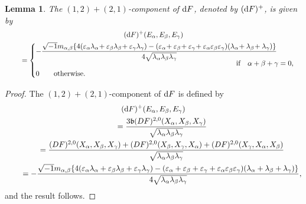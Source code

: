 \documentclass[10pt,a4paper]{amsart}
\numberwithin{equation}{section}
\newtheorem{Lemma}[Theorem]{Lemma}
\begin{document}
\begin{Lemma}
The $(1,2)+(2,1)$-component of ${\rm d}F$, denoted by $({\rm d}F)^{+}$, is given by
\begin{gather*}
({\rm d}F)^{+}(E_{\alpha},E_{\beta},E_{\gamma})
\\ \qquad
{}=\begin{cases}
-\dfrac{\sqrt{-1} m_{\alpha,\beta}\{4(\varepsilon_{\alpha}\lambda_{\alpha} \!+\varepsilon_{\beta}\lambda_{\beta}\!+\varepsilon_{\gamma}\lambda_{\gamma}) -(\varepsilon_{\alpha}\!+\varepsilon_{\beta}\!+\varepsilon_{\gamma} \!+\varepsilon_{\alpha}\varepsilon_{\beta}\varepsilon_{\gamma})(\lambda_{\alpha}\!+\lambda_{\beta} \!+\lambda_{\gamma})\}}{4\sqrt{\lambda_{\alpha}\lambda_{\beta}\lambda_{\gamma}}}
\\[-1ex]
\hspace{98mm}\text{if} \quad \alpha+\beta+\gamma = 0,
\\
0 \qquad \text{otherwise.}
\end{cases}
\end{gather*}
\end{Lemma}
\begin{proof}
 The $(1,2)+(2,1)$-component of ${\rm d}F$ is defined by
\begin{gather*}
({\rm d}F)^{+}(E_{\alpha},E_{\beta},E_{\gamma})
\\ \qquad
{}=\dfrac{3\mathfrak{b}(DF)^{2,0}(X_{\alpha},X_{\beta},X_{\gamma})} {\sqrt{\lambda_{\alpha}\lambda_{\beta}\lambda_{\gamma}}}
\\ \qquad
{}=\dfrac{(DF)^{2,0}(X_{\alpha},X_{\beta},X_{\gamma})+(DF)^{2,0}(X_{\beta},X_{\gamma},X_{\alpha}) +(DF)^{2,0}(X_{\gamma},X_{\alpha},X_{\beta})}{\sqrt{\lambda_{\alpha}\lambda_{\beta}\lambda_{\gamma}}}
\\ \qquad
{}=-\dfrac{\sqrt{-1} m_{\alpha,\beta}\{4(\varepsilon_{\alpha}\lambda_{\alpha} +\varepsilon_{\beta}\lambda_{\beta}+\varepsilon_{\gamma}\lambda_{\gamma}) -(\varepsilon_{\alpha}+\varepsilon_{\beta}+\varepsilon_{\gamma} +\varepsilon_{\alpha}\varepsilon_{\beta}\varepsilon_{\gamma}) (\lambda_{\alpha}+\lambda_{\beta}+\lambda_{\gamma})\}} {4\sqrt{\lambda_{\alpha}\lambda_{\beta}\lambda_{\gamma}}},
\end{gather*}
and the result follows.
\end{proof}
\end{document}
